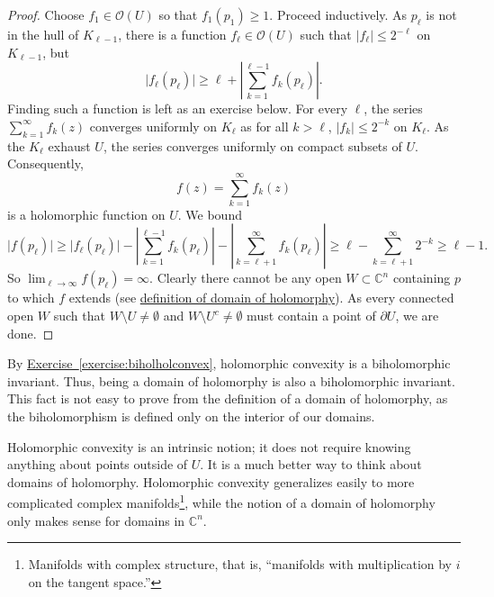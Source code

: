 \documentclass[12pt,openany]{book}
\newcommand{\sabs}[1]{\lvert {#1} \rvert}
\newcommand{\abs}[1]{\left\lvert {#1} \right\rvert}
\newcommand{\C}{{\mathbb{C}}}
\newcommand{\sO}{{\mathscr{O}}}
\theoremstyle{plain}
\theoremstyle{remark}
\theoremstyle{definition}
\theoremstyle{exercise}
\theoremstyle{example}
\newcommand{\exerciseref}[1]{\hyperref[#1]{Exercise~\ref*{#1}}}
\begin{document}
\begin{proof}
Choose $f_1 \in \sO(U)$ so that $f_1(p_1) \geq 1$.
Proceed inductively.
As $p_\ell$ is not in the hull of $K_{\ell-1}$, there is a function $f_\ell \in
\sO(U)$ such that $\sabs{f_\ell} \leq 2^{-\ell}$ on $K_{\ell-1}$, but
\begin{equation*}
\sabs{f_\ell(p_\ell)} \geq \ell + \abs{\sum_{k=1}^{\ell-1} f_k(p_\ell)} .
\end{equation*}
Finding such a function is left as an exercise below.
For every $\ell$, the series $\sum_{k=1}^\infty f_k(z)$ converges uniformly on
$K_\ell$
as for all $k > \ell$, $\sabs{f_k} \leq 2^{-k}$ on $K_\ell$.
As the $K_\ell$ exhaust $U$, the series converges uniformly on compact
subsets of $U$.  Consequently,
\begin{equation*}
f(z) = \sum_{k=1}^\infty f_k(z)
\end{equation*}
is a holomorphic function on $U$.  We bound
\begin{equation*}
\sabs{f(p_\ell)} \geq
\sabs{f_\ell(p_\ell)}
-
\abs{\sum_{k=1}^{\ell-1} f_k(p_\ell)}
-
\abs{\sum_{k=\ell+1}^\infty f_k(p_\ell)}
\geq
\ell
-
\sum_{k=\ell+1}^\infty 2^{-k}
\geq \ell-1 .
\end{equation*}
So $\lim_{\ell\to\infty} f(p_\ell) = \infty$.
Clearly there cannot be any open $W \subset \C^n$
containing $p$ to which $f$ extends (see
\hyperref[defn:domainofhol]{definition of domain of holomorphy}).  As every
connected open $W$ such that
$W \setminus U \not= \emptyset$
and
$W \setminus U^c \not= \emptyset$
must contain a
point of $\partial U$, we are done.
\end{proof}

By \exerciseref{exercise:biholholconvex},
holomorphic convexity is a biholomorphic invariant.
Thus,
being a domain of holomorphy is also a biholomorphic invariant.  This
fact is not easy to prove from the definition of a domain of
holomorphy, as the
biholomorphism is defined only on the interior of our domains.

Holomorphic convexity is an intrinsic notion; it does not require
knowing anything about points outside of $U$.  It is a much
better way to think about domains of holomorphy.  Holomorphic
convexity generalizes easily to more complicated complex
manifolds\footnote{Manifolds with complex structure, that is, ``manifolds
with multiplication by $i$ on the tangent space.''}, while
the notion of a domain of holomorphy only makes sense for domains in $\C^n$.
\end{document}

